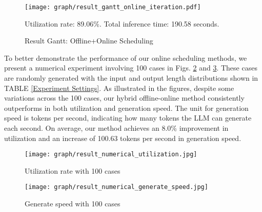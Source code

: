 \begin{figure}
    \centering
    \texttt{[image: graph/result\_gantt\_online\_iteration.pdf]}
    \begin{flushleft}
    \vspace{-2em}
    \caption*{Utilization rate: 89.06\%. Total inference time: 190.58 seconds.}
    \end{flushleft}
    \vspace{-2em}
    \caption{Result Gantt: Offline+Online Scheduling}
    \label{fig:online+offline}
\end{figure}


To better demonstrate the performance of our online scheduling methods, we present a numerical experiment involving 100 cases in Figs. \ref{fig:result_numerical_utilization} and  \ref{fig:result_numerical_generate_speed}. These cases are randomly generated with the input and output length distributions shown in TABLE \ref{Experiment Settings}. As illustrated in the figures, despite some variations across the 100 cases, our hybrid offline-online method consistently outperforms in both utilization and generation speed. The unit for generation speed is tokens per second, indicating how many tokens the LLM can generate each second. On average, our method achieves an 8.0\% improvement in utilization and an increase of 100.63 tokens per second in generation speed.



\begin{figure}
    \centering
    \texttt{[image: graph/result\_numerical\_utilization.jpg]}
    \caption{Utilization rate with 100 cases}
    \label{fig:result_numerical_utilization}
\end{figure}

\begin{figure}
    \centering
    \texttt{[image: graph/result\_numerical\_generate\_speed.jpg]}
    \caption{Generate speed with 100 cases}
    \label{fig:result_numerical_generate_speed}
\end{figure}